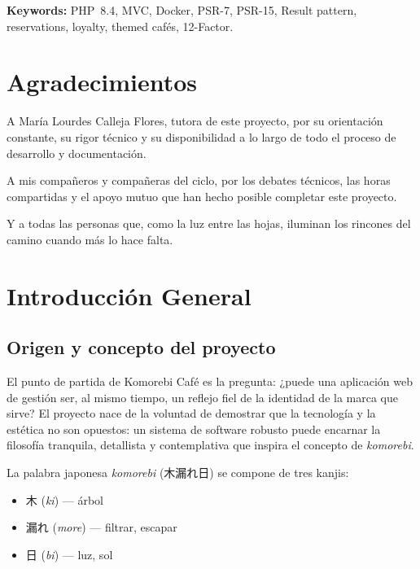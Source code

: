 \documentclass[12pt,a4paper,twoside,openright]{report}
\begin{document}
\bigskip
\textbf{Keywords:} PHP~8.4, MVC, Docker, PSR-7, PSR-15, Result pattern, reservations,
loyalty, themed cafés, 12-Factor.

\chapter*{Agradecimientos}

A María Lourdes Calleja Flores, tutora de este proyecto, por su orientación constante,
su rigor técnico y su disponibilidad a lo largo de todo el proceso de desarrollo y
documentación.

A mis compañeros y compañeras del ciclo, por los debates técnicos, las horas compartidas
y el apoyo mutuo que han hecho posible completar este proyecto.

Y a todas las personas que, como la luz entre las hojas, iluminan los rincones del camino
cuando más lo hace falta.

\tableofcontents
\listoffigures
\listoftables

\clearpage
{}
\pagestyle{fancy}

\chapter{Introducción General}
\label{chap:intro}

\section{Origen y concepto del proyecto}
\label{sec:origen}

El punto de partida de Komorebi Café es la pregunta: ¿puede una aplicación web de gestión
ser, al mismo tiempo, un reflejo fiel de la identidad de la marca que sirve? El proyecto
nace de la voluntad de demostrar que la tecnología y la estética no son opuestos: un
sistema de software robusto puede encarnar la filosofía tranquila, detallista y contemplativa
que inspira el concepto de \textit{komorebi}.

La palabra japonesa \textit{komorebi} (木漏れ日) se compone de tres kanjis:
\begin{itemize}[nosep]
  \item 木 (\textit{ki}) — árbol
  \item 漏れ (\textit{more}) — filtrar, escapar
  \item 日 (\textit{bi}) — luz, sol
\end{itemize}
\end{document}
